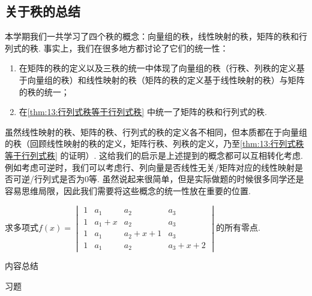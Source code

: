 \begin{solution}

\end{solution}

\subsection{关于秩的总结}

本学期我们一共学习了四个秩的概念：向量组的秩，线性映射的秩，矩阵的秩和行列式的秩. 事实上，我们在很多地方都讨论了它们的统一性：
\begin{enumerate}
    \item 在矩阵的秩的定义以及三秩的统一中体现了向量组的秩（行秩、列秩的定义基于向量组的秩）和线性映射的秩（矩阵的秩的定义基于线性映射的秩）与矩阵的秩的统一；

    \item 在\autoref{thm:13:行列式秩等于行列式秩} 中统一了矩阵的秩和行列式的秩.
\end{enumerate}
虽然线性映射的秩、矩阵的秩、行列式的秩的定义各不相同，但本质都在于向量组的秩（回顾线性映射的秩的定义，矩阵行秩、列秩的定义，乃至\autoref*{thm:13:行列式秩等于行列式秩} 的证明）. 这给我们的启示是上述提到的概念都可以互相转化考虑. 例如考虑可逆时，我们可以考虑行、列向量是否线性无关/矩阵对应的线性映射是否可逆/行列式是否为0等. 虽然说起来很简单，但是实际做题的时候很多同学还是容易思维局限，因此我们需要将这些概念的统一性放在重要的位置.
\begin{example}
    求多项式$f(x)=\begin{vmatrix}
            1 & a_1   & a_2     & a_3     \\
            1 & a_1+x & a_2     & a_3     \\
            1 & a_1   & a_2+x+1 & a_3     \\
            1 & a_1   & a_2     & a_3+x+2
        \end{vmatrix}$的所有零点.
\end{example}

\vspace{2ex}
\centerline{\heiti \Large 内容总结}

\vspace{2ex}
\centerline{\heiti \Large 习题}

\vspace{2ex}
{\kaishu }
\begin{flushright}
    \kaishu

\end{flushright}

